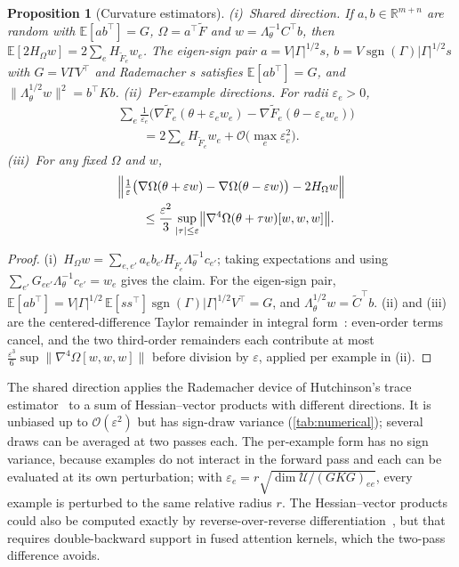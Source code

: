 \documentclass[11pt]{article}
\newtheorem{proposition}{Proposition}
\newcommand{\R}{\mathbb{R}}
\newcommand{\U}{\mathcal{U}}
\newcommand{\Lam}{\Lambda_{\theta}}
\newcommand{\Ft}{\widetilde{F}}
\begin{document}
\begin{proposition}[Curvature estimators]
\label{prop:randomized}
(i)~\emph{Shared direction.} If $a,b\in\R^{m+n}$ are random with $\mathbb E[ab^\top]=G$, $\Omega=a^\top\Ft$ and $w=\Lam^{-1}C^\top b$, then $\mathbb E[2H_\Omega w]=2\sum_eH_{\Ft_e}w_e$. The eigen-sign pair $a=V|\Gamma|^{1/2}s$, $b=V\operatorname{sgn}(\Gamma)|\Gamma|^{1/2}s$ with $G=V\Gamma V^\top$ and Rademacher $s$ satisfies $\mathbb E[ab^\top]=G$, and $\|\Lam^{1/2}w\|^2=b^\top Kb$.
(ii)~\emph{Per-example directions.} For radii $\varepsilon_e>0$,
\begin{equation*}
\begin{aligned}
&\textstyle\sum_e\frac{1}{\varepsilon_e}\bigl(\nabla\Ft_e(\theta+\varepsilon_ew_e)-\nabla\Ft_e(\theta-\varepsilon_ew_e)\bigr)\\
&\qquad=2\textstyle\sum_eH_{\Ft_e}w_e+\mathcal O\bigl(\max_e\varepsilon_e^2\bigr).
\end{aligned}
\end{equation*}
(iii)~For any fixed $\Omega$ and $w$,
\begin{equation}
\begin{aligned}
&\Bigl\|\tfrac{1}{\varepsilon}\bigl(\nabla\Omega(\theta+\varepsilon w)-\nabla\Omega(\theta-\varepsilon w)\bigr)-2H_\Omega w\Bigr\|\\
&\qquad\le\frac{\varepsilon^2}{3}\sup_{|\tau|\le\varepsilon}\bigl\|\nabla^4\Omega(\theta+\tau w)[w,w,w]\bigr\| .
\end{aligned}
\label{eq:app_fd}
\end{equation}
\end{proposition}
\begin{proof}
(i)~$H_\Omega w=\sum_{e,e'}a_eb_{e'}H_{\Ft_e}\Lam^{-1}c_{e'}$; taking expectations and using $\sum_{e'}G_{ee'}\Lam^{-1}c_{e'}=w_e$ gives the claim. For the eigen-sign pair, $\mathbb E[ab^\top]=V|\Gamma|^{1/2}\,\mathbb E[ss^\top]\operatorname{sgn}(\Gamma)|\Gamma|^{1/2}V^\top=G$, and $\Lam^{1/2}w=\widetilde C^\top b$. (ii) and (iii) are the centered-difference Taylor remainder in integral form~\citep{nocedal2006numerical}: even-order terms cancel, and the two third-order remainders each contribute at most $\tfrac{\varepsilon^3}{6}\sup\|\nabla^4\Omega[w,w,w]\|$ before division by $\varepsilon$, applied per example in (ii).
\end{proof}
The shared direction applies the Rademacher device of Hutchinson's trace estimator~\citep{hutchinson1989stochastic} to a sum of Hessian--vector products with different directions. It is unbiased up to $\mathcal O(\varepsilon^2)$ but has sign-draw variance (\cref{tab:numerical}); several draws can be averaged at two passes each. The per-example form has no sign variance, because examples do not interact in the forward pass and each can be evaluated at its own perturbation; with $\varepsilon_e=r\sqrt{\dim\U/(GKG)_{ee}}$, every example is perturbed to the same relative radius $r$. The Hessian--vector products could also be computed exactly by reverse-over-reverse differentiation~\citep{pearlmutter1994fast}, but that requires double-backward support in fused attention kernels, which the two-pass difference avoids.
\end{document}
